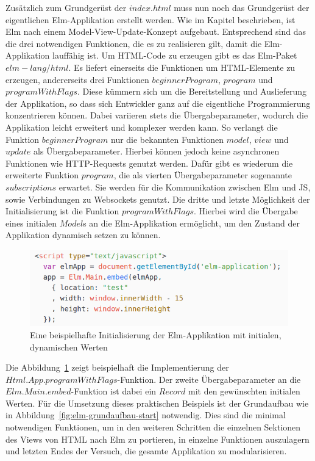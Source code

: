 Zusätzlich zum Grundgerüst der $index.html$ muss nun noch das Grundgerüst der eigentlichen Elm-Applikation erstellt werden. Wie im Kapitel  beschrieben, ist Elm nach einem Model-View-Update-Konzept aufgebaut. Entsprechend sind das die drei notwendigen Funktionen, die es zu realisieren gilt, damit die Elm-Applikation lauffähig ist. Um \ac{HTML}-Code zu erzeugen gibt es das Elm-Paket $elm-lang/html$. Es liefert einerseits die Funktionen um \ac{HTML}-Elemente zu erzeugen, andererseits drei Funktionen $beginnerProgram$, $program$ und $programWithFlags$. Diese kümmern sich um die Bereitstellung und Auslieferung der Applikation, so dass sich Entwickler ganz auf die eigentliche Programmierung konzentrieren können. Dabei variieren stets die Übergabeparameter, wodurch die Applikation leicht erweitert und komplexer werden kann. So verlangt die Funktion $beginnerProgram$ nur die bekannten Funktionen $model$, $view$ und $update$ als Übergabeparameter. Hierbei können jedoch keine asynchronen Funktionen wie \ac{HTTP}-Requests genutzt werden.
Dafür gibt es wiederum die erweiterte Funktion $program$, die als vierten Übergabeparameter sogenannte $subscriptions$ erwartet. Sie werden für die Kommunikation zwischen Elm und \ac{JS}, sowie Verbindungen zu Websockets genutzt.
Die dritte und letzte Möglichkeit der Initialisierung ist die Funktion $programWithFlags$. Hierbei wird die Übergabe eines initialen $Model$s an die Elm-Applikation ermöglicht, um den Zustand der Applikation dynamisch setzen zu können.
\begin{figure}[ht]
\centering\includegraphics[scale=0.6]{img/programWithFlags_pass_data.png}
\caption{Eine beispielhafte Initialisierung der Elm-Applikation mit initialen, dynamischen Werten}\label{fig:programWithFlags}
\end{figure}
Die Abbildung~\ref{fig:programWithFlags} zeigt beispielhaft die Implementierung der $Html.App.programWithFlags$-Funktion. Der zweite Übergabeparameter an die $Elm.Main.embed$-Funktion ist dabei ein $Record$ mit den gewünschten initialen Werten.
Für die Umsetzung dieses praktischen Beispiels ist der Grundaufbau wie in Abbildung~\ref{fig:elm-grundaufbau-start} notwendig. Dies sind die minimal notwendigen Funktionen, um in den weiteren Schritten die einzelnen Sektionen des Views von \ac{HTML} nach Elm zu portieren, in einzelne Funktionen auszulagern und letzten Endes der Versuch, die gesamte Applikation zu modularisieren.
